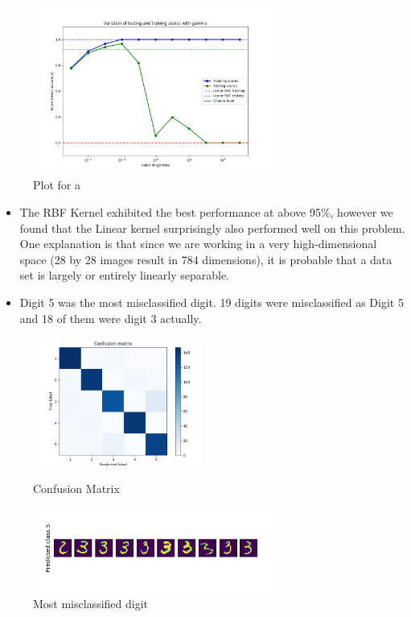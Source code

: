 \documentclass[a4paper]{article}
\begin{document}
\begin{figure}[h]
  \begin{center}
    \includegraphics[width=0.7\textwidth]{3_a.png}
    \caption{Plot for a}
  \end{center}
\end{figure}
\begin{itemize}
  \item The RBF Kernel exhibited the best performance at above 95\%, however we found that the Linear kernel surprisingly also performed well on this problem.  One explanation is that since we are working in a very high-dimensional space (28 by 28 images result in 784 dimensions), it is probable that a data set is largely or entirely linearly separable.
  \item Digit 5 was the most misclassified digit. 19 digits were misclassified as Digit 5 and 18 of them were digit 3 actually.
\end{itemize}
\begin{figure}[h]
  \begin{center}
    \includegraphics[width=0.5\textwidth]{3_b_cm.png}
    \caption{Confusion Matrix}
    \includegraphics[width=0.7\textwidth]{3_b_err.png}
    \caption{Most misclassified digit}
  \end{center}
\end{figure}
\end{document}
